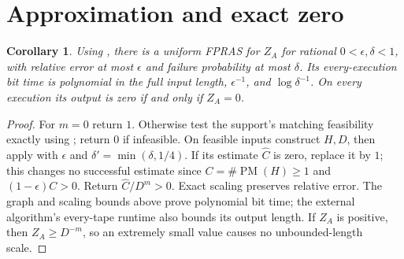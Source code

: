 \documentclass[11pt]{article}
\newtheorem{corollary}[theorem]{Corollary}
\newcommand{\PM}{\operatorname{PM}}
\begin{document}
\section{Approximation and exact zero}
\begin{corollary}\label{cor:fpras}
Using \cite{OAI}, there is a uniform FPRAS for $Z_A$ for rational $0<\epsilon,\delta<1$, with relative error at most $\epsilon$ and failure probability at most $\delta$. Its every-execution bit time is polynomial in the full input length, $\epsilon^{-1}$, and $\log\delta^{-1}$. On every execution its output is zero if and only if $Z_A=0$.
\end{corollary}
\begin{proof}
For $m=0$ return $1$. Otherwise test the support's matching feasibility exactly using \cite{Edmonds}; return $0$ if infeasible. On feasible inputs construct $H,D$, then apply \cite{OAI} with $\epsilon$ and $\delta'=\min(\delta,1/4)$. If its estimate $\widehat C$ is zero, replace it by $1$; this changes no successful estimate since $C=\#\PM(H)\ge1$ and $(1-\epsilon)C>0$. Return $\widehat C/D^m>0$. Exact scaling preserves relative error. The graph and scaling bounds above prove polynomial bit time; the external algorithm's every-tape runtime also bounds its output length. If $Z_A$ is positive, then $Z_A\ge D^{-m}$, so an extremely small value causes no unbounded-length scale.
\end{proof}
\end{document}
